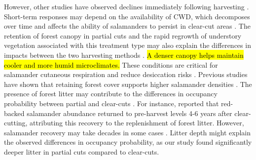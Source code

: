 However, other studies have observed declines immediately following harvesting \citep{deMaynadier1995relationshipforest,Macneil2014Effectstimber}. 
Short-term responses may depend on the availability of CWD, which decomposes over time and affects the ability of salamanders to persist in clear-cut areas \citep{Ochs2022Responseterrestrial}. 
The retention of forest canopy in partial cuts and the rapid regrowth of understory vegetation associated with this treatment type may also explain the differences in impacts between the two harvesting methods \citep{Raybuck2015silviculturalpractices}. 
\hl{A denser canopy helps maintain cooler and more humid microclimates. } 
These conditions are critical for salamander cutaneous respiration and reduce desiccation risks \citep{Homyack2011Energeticssurface}. 
Previous studies have shown that retaining forest cover supports higher salamander densities \citep{Hocking2013Effectsexperimental,Harper2015Impactforestry,Mahoney2016Woodlandsalamander}. 
The presence of forest litter may contribute to the differences in occupancy probability between partial and clear-cuts \citep{tilghmanMetaanalysisEffectsCanopy2012}. 
For instance, \cite{Ash1997DisappearanceReturn} reported that red-backed salamander abundance returned to pre-harvest levels 4-6 years after clear-cutting, attributing this recovery to the replenishment of forest litter. 
However, salamander recovery may take decades in some cases \citep{Homyack2013Effectsrepeatedstand,Ochs2022Responseterrestrial}. 
Litter depth might explain the observed differences in occupancy probability, as our study found significantly deeper litter in partial cuts compared to clear-cuts. 

